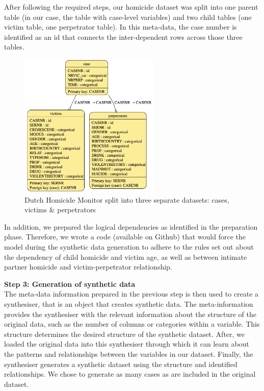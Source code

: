 After following the required steps, our homicide dataset was split into one parent table (in our case, the table with case-level variables) and two child tables (one victim table, one perpetrator table). In this meta-data, the case number is identified as an id that connects the inter-dependent rows across those three tables. 

\vspace{10pt}
\begin{figure}[H]
    \centering
    \includegraphics[width=0.6\textwidth]{Images/meta1.png}
    \caption{Dutch Homicide Monitor split into three separate datasets: cases, victims \& perpetrators}
    \label{fig:proof_1}
\end{figure}
\vspace{10pt}

In addition, we prepared the logical dependencies as identified in the preparation phase. Therefore, we wrote a code (available on Github) that would force the model during the synthetic data generation to adhere to the rules set out about the dependency of child homicide and victim age, as well as between intimate partner homicide and victim-perpetrator relationship.

\textbf{Step 3: Generation of synthetic data} \\
The meta-data information prepared in the previous step is then used to create a synthesiser, that is an object that creates synthetic data. The meta-information provides the synthesiser with the relevant information about the structure of the original data, such as the number of columns or categories within a variable. This structure determines the desired structure of the synthetic dataset. After, we loaded the original data into this synthesiser through which it can learn about the patterns and relationships between the variables in our dataset. Finally, the synthesiser generates a synthetic dataset using the structure and identified relationships. We chose to generate as many cases as are included in the original dataset. \\

